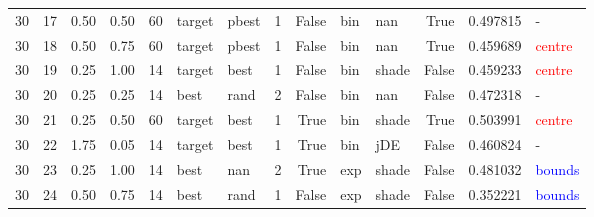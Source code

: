 \begin{tabular}{rlrrrllrrllrrl}
30 & 17 & 0.50 & 0.50 & 60 & target & pbest & 1 & False & bin & nan & True & 0.497815 & - \\
30 & 18 & 0.50 & 0.75 & 60 & target & pbest & 1 & False & bin & nan & True & 0.459689 & \textcolor{red}{centre} \\
30 & 19 & 0.25 & 1.00 & 14 & target & best & 1 & False & bin & shade & False & 0.459233 & \textcolor{red}{centre} \\
30 & 20 & 0.25 & 0.25 & 14 & best & rand & 2 & False & bin & nan & False & 0.472318 & - \\
30 & 21 & 0.25 & 0.50 & 60 & target & best & 1 & True & bin & shade & True & 0.503991 & \textcolor{red}{centre} \\
30 & 22 & 1.75 & 0.05 & 14 & target & best & 1 & True & bin & jDE & False & 0.460824 & - \\
30 & 23 & 0.25 & 1.00 & 14 & best & nan & 2 & True & exp & shade & False & 0.481032 & \textcolor{blue}{bounds} \\
30 & 24 & 0.50 & 0.75 & 14 & best & rand & 1 & False & exp & shade & False & 0.352221 & \textcolor{blue}{bounds} \\
\bottomrule
\end{tabular}

